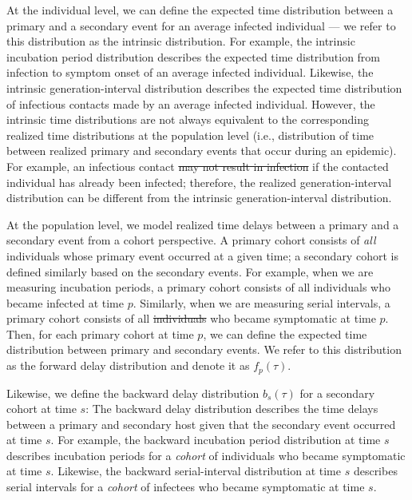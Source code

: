 \documentclass[12pt]{article}
\newcommand{\psymp}{\ensuremath{p}} %
\newcommand{\ssymp}{\ensuremath{s}} %
\providecommand{\DIFaddtex}[1]{{\protect\color{blue}\uwave{#1}}} %
\providecommand{\DIFdeltex}[1]{{\protect\color{red}\sout{#1}}}                      %
\providecommand{\DIFaddbegin}{} %
\providecommand{\DIFaddend}{} %
\providecommand{\DIFdelbegin}{} %
\providecommand{\DIFdelend}{} %
\providecommand{\DIFadd}[1]{\texorpdfstring{\DIFaddtex{#1}}{#1}} %
\providecommand{\DIFdel}[1]{\texorpdfstring{\DIFdeltex{#1}}{}} %
\newcommand{\DIFscaledelfig}{0.5}
\newlength{\DIFdelgraphicswidth} %
\newlength{\DIFdelgraphicsheight} %
\newcommand{\DIFaddincludegraphics}[2][]{{\color{blue}\fbox{\DIFOincludegraphics[#1]{#2}}}} %
\newcommand{\DIFdelincludegraphics}[2][]{%
\sbox{\DIFdelgraphicsbox}{\DIFOincludegraphics[#1]{#2}}%
\settoboxwidth{\DIFdelgraphicswidth}{\DIFdelgraphicsbox} %
\settoboxtotalheight{\DIFdelgraphicsheight}{\DIFdelgraphicsbox} %
\scalebox{\DIFscaledelfig}{%
\parbox[b]{\DIFdelgraphicswidth}{\usebox{\DIFdelgraphicsbox}\\[-\baselineskip] \rule{\DIFdelgraphicswidth}{0em}}\llap{\resizebox{\DIFdelgraphicswidth}{\DIFdelgraphicsheight}{%
\setlength{\unitlength}{\DIFdelgraphicswidth}%
\begin{picture}(1,1)%
\thicklines\linethickness{2pt} %
{\color[rgb]{1,0,0}\put(0,0){\framebox(1,1){}}}%
{\color[rgb]{1,0,0}\put(0,0){\line( 1,1){1}}}%
{\color[rgb]{1,0,0}\put(0,1){\line(1,-1){1}}}%
\end{picture}%
}\hspace*{3pt}}} %
} %
\DeclareRobustCommand{\DIFaddbegin}{\DIFOaddbegin \let\includegraphics\DIFaddincludegraphics} %
\DeclareRobustCommand{\DIFaddend}{\DIFOaddend \let\includegraphics\DIFOincludegraphics} %
\DeclareRobustCommand{\DIFdelbegin}{\DIFOdelbegin \let\includegraphics\DIFdelincludegraphics} %
\DeclareRobustCommand{\DIFdelend}{\DIFOaddend \let\includegraphics\DIFOincludegraphics} %
\begin{document}
At the individual level, we can define the expected time distribution between a primary and a secondary event for an average infected individual --- we refer to this distribution as the intrinsic distribution.
For example, the intrinsic incubation period distribution describes the expected time distribution from infection to symptom onset of an average infected individual.
Likewise, the intrinsic generation-interval distribution describes the expected time distribution of infectious contacts made by an average infected individual.
However, the intrinsic time distributions are not always equivalent to the corresponding realized time distributions at the population level (i.e., distribution of time between realized primary and secondary events that occur during an epidemic).
For example, an infectious contact \DIFdelbegin \DIFdel{may not result in infection }\DIFdelend \DIFaddbegin \DIFadd{results in infection only }\DIFaddend if the contacted individual \DIFaddbegin \DIFadd{is susceptible (and }\DIFaddend has already been infected\DIFaddbegin \DIFadd{)}\DIFaddend ;
therefore, the realized generation-interval distribution can be different from the intrinsic generation-interval distribution.

At the population level, we model realized time delays between a primary and a secondary event from a cohort perspective.
A primary cohort consists of \emph{all} individuals whose primary event occurred at a given time; 
a secondary cohort is defined similarly based on the secondary events.
For example, when we are measuring incubation periods, a primary cohort consists of all individuals who became infected at time $\psymp$.
Similarly, when we are measuring serial intervals, a primary cohort consists of all \DIFdelbegin \DIFdel{individuals }\DIFdelend \DIFaddbegin \DIFadd{infectors }\DIFaddend who became symptomatic at time $\psymp$.
Then, for each primary cohort at time $\psymp$, we can define the expected time distribution between primary and secondary events.
We refer to this distribution as the forward delay distribution and denote it as $f_\psymp(\tau)$.

Likewise, we define the backward delay distribution $b_\ssymp(\tau)$ for a secondary cohort at time $\ssymp$:
The backward delay distribution describes the time delays between a primary and secondary host given that the secondary event occurred at time $\ssymp$.
For example, the backward incubation period distribution at time $\ssymp$ describes incubation periods for a \emph{cohort} of individuals who became symptomatic at time $\ssymp$.
Likewise, the backward serial-interval distribution at time $\ssymp$ describes serial intervals for a \emph{cohort} of infectees who became symptomatic at time $\ssymp$.
\end{document}
